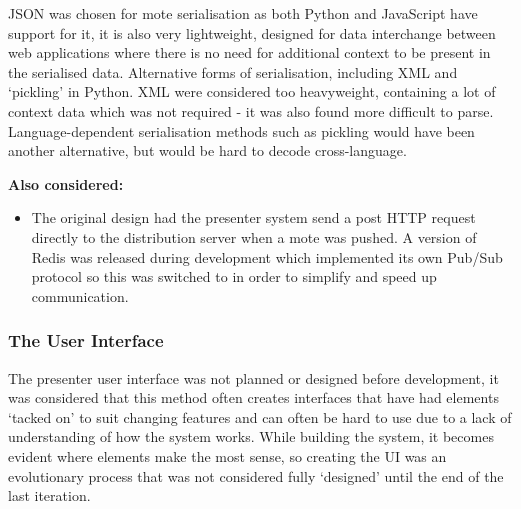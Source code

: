 \documentclass[a4papert,11pt,notitlepage]{article}
\begin{document}
JSON\cite{json:web} was chosen for mote serialisation as both Python and JavaScript have support for it, it is also very lightweight, designed for data interchange between web applications where there is no need for additional context to be present in the serialised data. Alternative forms of serialisation, including XML\cite{xml:web} and `pickling'\cite{pickle:web} in Python. XML were considered too heavyweight, containing a lot of context data which was not required - it was also found more difficult to parse. Language-dependent serialisation methods such as pickling would have been another alternative, but would be hard to decode cross-language.

\textbf{Also considered:}
\begin{itemize}
\item The original design had the presenter system send a post HTTP request directly to the distribution server when a mote was pushed. A version of Redis was released during development which implemented its own Pub/Sub protocol so this was switched to in order to simplify and speed up communication.
\end{itemize}

\subsubsection{The User Interface}
The presenter user interface was not planned or designed before development, it was considered that this method often creates interfaces that have had elements `tacked on' to suit changing features and can often be hard to use due to a lack of understanding of how the system works. While building the system, it becomes evident where elements make the most sense, so creating the UI was an evolutionary process that was not considered fully `designed' until the end of the last iteration.
\end{document}
